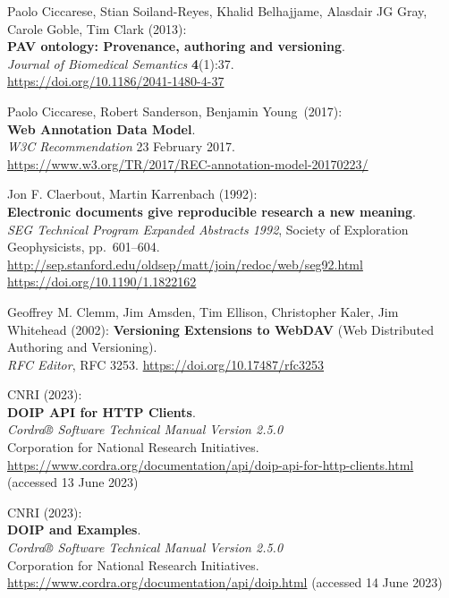 \begin{thebibliography}{9}
Paolo Ciccarese, Stian Soiland-Reyes, Khalid Belhajjame, Alasdair JG
Gray, Carole Goble, Tim Clark (2013): \\
\textbf{PAV ontology: Provenance, authoring and versioning}. \\
\emph{Journal of Biomedical Semantics} \textbf{4}(1):37.\\
\url{https://doi.org/10.1186/2041-1480-4-37}

Paolo Ciccarese, Robert Sanderson, Benjamin Young~(2017):\\
\textbf{Web Annotation Data Model}.\\
\emph{W3C Recommendation} 23 February 2017.\\
\url{https://www.w3.org/TR/2017/REC-annotation-model-20170223/}

Jon F. Claerbout, Martin Karrenbach (1992):\\
\textbf{Electronic documents give reproducible research a new
meaning}.\\
\emph{SEG Technical Program Expanded Abstracts 1992}, Society of
Exploration Geophysicists, pp.~601--604.\\
\url{http://sep.stanford.edu/oldsep/matt/join/redoc/web/seg92.html}\\
\url{https://doi.org/10.1190/1.1822162}

Geoffrey M. Clemm, Jim Amsden, Tim Ellison, Christopher Kaler, Jim Whitehead (2002):
\textbf{Versioning Extensions to WebDAV} (Web Distributed Authoring and Versioning).\\
\emph{RFC Editor}, RFC 3253.
\url{https://doi.org/10.17487/rfc3253}

CNRI (2023): \\
\textbf{DOIP API for HTTP Clients}.\\
\emph{Cordra® Software Technical Manual Version 2.5.0}\\
Corporation for National Research Initiatives.\\
\url{https://www.cordra.org/documentation/api/doip-api-for-http-clients.html}
(accessed 13 June 2023)

CNRI (2023): \\
\textbf{DOIP and Examples}.\\
\emph{Cordra® Software Technical Manual Version 2.5.0}\\
Corporation for National Research Initiatives.\\
\url{https://www.cordra.org/documentation/api/doip.html}
(accessed 14 June 2023)


\end{thebibliography}
